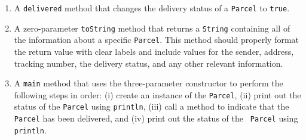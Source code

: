 \documentclass[12pt]{article}
\begin{document}
\begin{enumerate}
\begin{enumerate}
    \item A {\tt delivered} method that changes the delivery status of a {\tt Parcel} to {\tt true}.

    \item A zero-parameter {\tt toString} method that returns a {\tt String} containing all of the information about a
      specific {\tt Parcel}.  This method should properly format the return value with clear labels and include values
      for the sender, address, tracking number, the delivery status, and any other relevant information.

    \item A {\tt main} method that uses the three-parameter constructor to perform the following steps in order: (i)
      create an instance of the {\tt Parcel}, (ii) print out the status of the {\tt Parcel} using {\tt println}, (iii)
      call a method to indicate that the {\tt Parcel} has been delivered, and (iv) print out the status of the {\tt
        Parcel} using {\tt println}.

  \end{enumerate}

\end{enumerate}
\end{document}
